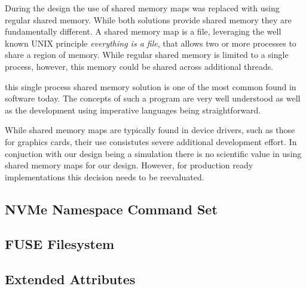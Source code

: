 During the design the use of shared memory maps was replaced with using regular
shared memory. While both solutions provide shared memory they are fundamentally
different. A shared memory map is a file, leveraging the well known UNIX
principle \textit{everything is a file}, that allows two or more processes to
share a region of memory. While regular shared memory is limited to a single
process, however, this memory could be shared across additional threads.

this single process shared memory solution is one of the most common found in
software today. The concepts of such a program are very well understood as
well as the development using imperative languages being straightforward.

While shared memory maps are typically found in device drivers, such as those
for graphics cards, their use consistutes severe additional development effort.
In conjuction with our design being a simulation there is no scientific value in
using shared memory maps for our design. However, for production ready
implementations this decision needs to be reevaluated.

\subsection{NVMe Namespace Command Set}

\subsection{FUSE Filesystem}


\subsection{Extended Attributes}

